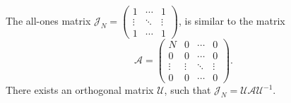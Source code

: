 \begin{lem}
    The all-ones matrix
    \( \mathcal{J}_N =
    \begin{pmatrix}
        1 & \cdots & 1 \\
        \vdots & \ddots & \vdots \\ 
    1 & \cdots & 1 \end{pmatrix} \),
    is similar to the matrix
    \[
        \mathcal{A} = \begin{pmatrix}
            N & 0 & \cdots & 0 \\
            0 & 0 & \cdots & 0 \\
            \vdots & \vdots & \ddots & \vdots \\
            0 & 0 & \cdots & 0 \end{pmatrix}. \]
    There exists an orthogonal matrix \( \mathcal{U} \),
    such that
    \( \mathcal{J}_N = \mathcal{U}\mathcal{A} \mathcal{U}^{-1} \).
\end{lem}
